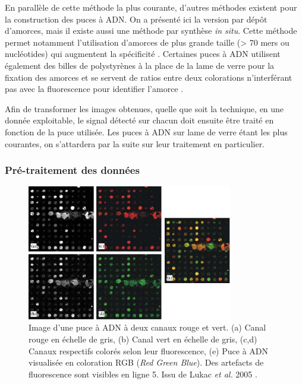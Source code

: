 


En parallèle de cette méthode la plus courante, d'autres méthodes existent pour la construction des puces à \acrshort{ADN}. On a présenté ici la version par dépôt d'amorces, mais il existe aussi une méthode par synthèse \textit{in situ}. Cette méthode permet notamment l'utilisation d'amorces de plus grande taille (> 70 mers ou nucléotides) qui augmentent la spécificité \cite{Liu2010}. Certaines puces à \acrshort{ADN} utilisent également des billes de polystyrènes à la place de la lame de verre pour la fixation des amorces et se servent de ratios entre deux colorations n'interférant pas avec la fluorescence pour identifier l'amorce \cite{Nesterov-Mueller2014Oct}. 

Afin de transformer les images obtenues, quelle que soit la technique, en une donnée exploitable, le signal détecté sur chacun doit ensuite être traité en fonction de la puce utilisée. Les puces à \acrshort{ADN} sur lame de verre étant les plus courantes, on s'attardera par la suite sur leur traitement en particulier.




\subsubsection{Pré-traitement des données}

\begin{figure}[ht]
    \centering
    \includegraphics[width=0.8\textwidth]{img/intro/2_meth_transcripto/intro_2_true_microarray_picture_10.1016_j.fss.2004.10.012.png}
    \caption[Image d'une puce à ADN à deux canaux rouge et vert]{Image d'une puce à ADN à deux canaux rouge et vert. (a) Canal rouge en échelle de gris, (b) Canal vert en échelle de gris, (c,d) Canaux respectifs colorés selon leur fluorescence, (e) Puce à ADN visualisée en coloration RGB (\textit{Red Green Blue}). Des artefacts de fluorescence sont visibles en ligne 5. Issu de Lukac \textit{et al.} 2005 \cite{Lukac2005May}.}
    \label{fig:intro_true_microarray_picture}
\end{figure}

